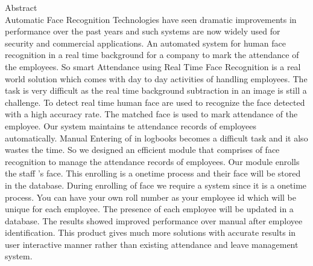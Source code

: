 \newpage
\thispagestyle{empty}

\begin{center}

\huge{Abstract}\\[0.5cm]
\normalsize
\textsc Automatic Face Recognition Technologies have seen dramatic improvements in performance over the past
years and such systems are now widely used for security and commercial applications. An automated system for human
face recognition in a real time background for a company to mark the attendance of the employees.
So smart Attendance using Real Time Face Recognition is a real world solution which comes with day to day activities
of handling employees. The task is very difficult as the real time background subtraction in an image is still a challenge.
To detect real time human face are used to recognize the face detected with a high accuracy rate. The matched face is
used to mark attendance of the employee.
Our system maintains te attendance records of employees automatically. Manual Entering of in logbooks becomes a
difficult task and it also wastes the time. So we designed an efficient module that comprises of face recognition to manage
the attendance records of employees. Our module enrolls the staff ’s face. This enrolling is a onetime process and their
face will be stored in the database. During enrolling of face we require a system since it is a onetime process. You can
have your own roll number as your employee id which will be unique for each employee.
The presence of each employee will be updated in a database. The results showed improved performance over manual
after employee identification. This product gives much more solutions with accurate results in user interactive manner
rather than existing attendance and leave management system.
\\


\end{center}
